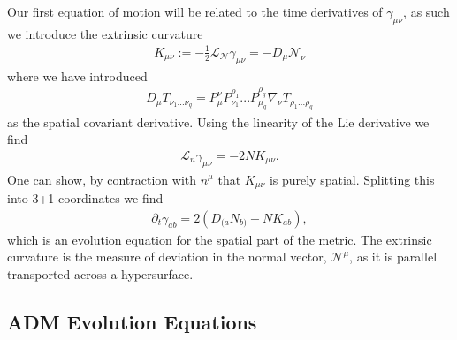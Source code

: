 \documentclass[10pt]{report}
\theoremstyle{definition}
\newcommand{\N}[0]{\mathcal{N}}
\begin{document}
Our first equation of motion will be related to the time derivatives of $\gamma_{\mu\nu}$, as such we introduce the extrinsic curvature 
\begin{align}
    K_{\mu\nu} := -\frac{1}{2} \mathcal{L}_{\N} \gamma_{\mu\nu} = -D_\mu \N_\nu
\end{align}
where we have introduced
\begin{align}
    D_\mu T_{\nu_1 ... \nu_q} = P_\mu^\nu P_{\nu_1}^{\rho_1} ... P_{\mu_q}^{\rho_q} \nabla_\nu T_{\rho_1 ... \rho_q}
\end{align}
as the spatial covariant derivative. Using the linearity of the Lie derivative we find 
\begin{align}
    \mathcal{L}_n \gamma_{\mu\nu} = -2N K_{\mu\nu}.
\end{align}
One can show, by contraction with $n^\mu$ that $K_{\mu\nu}$ is purely spatial. Splitting this into 3+1 coordinates we find 
\begin{align}
    \partial_t \gamma_{ab} = 2 \left( D_{(a} N_{b)} - N K_{ab} \right),
\end{align}
which is an evolution equation for the spatial part of the metric. The extrinsic curvature is the measure of deviation in the normal vector, $\mathcal{N}^\mu$, as it is parallel transported across a hypersurface.

\subsection{ADM Evolution Equations}
\end{document}
